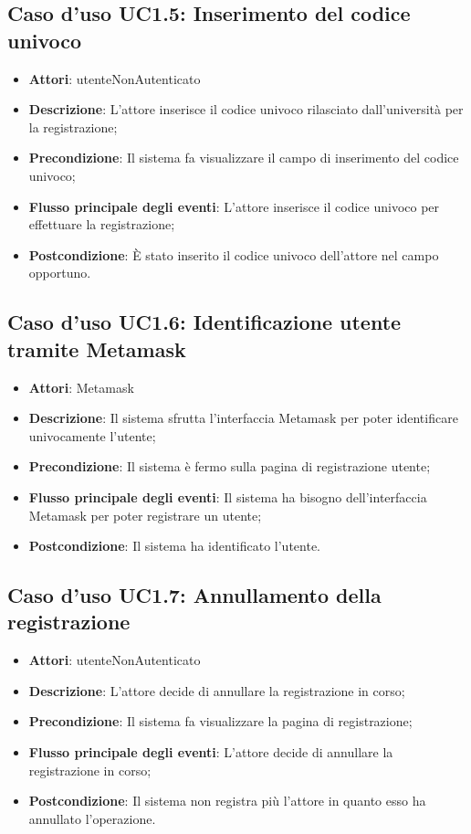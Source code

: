 \subsection{Caso d'uso \texorpdfstring{UC1.5}{UC1.5}: Inserimento del codice univoco}
\begin{itemize}
\item \textbf{Attori}: utenteNonAutenticato
\item \textbf{Descrizione}: L'attore inserisce il codice univoco rilasciato dall'università per la registrazione;
\item \textbf{Precondizione}: Il sistema fa visualizzare il campo di inserimento del codice univoco;
\item \textbf{Flusso principale degli eventi}: L'attore inserisce il codice univoco per effettuare la registrazione;
\item \textbf{Postcondizione}: È stato inserito il codice univoco dell'attore nel campo opportuno.
\end{itemize}
\subsection{Caso d'uso \texorpdfstring{UC1.6}{UC1.6}: Identificazione utente tramite Metamask}
\begin{itemize}
\item \textbf{Attori}: Metamask
\item \textbf{Descrizione}: Il sistema sfrutta l'interfaccia Metamask per poter identificare univocamente l'utente;
\item \textbf{Precondizione}: Il sistema è fermo sulla pagina di registrazione utente;
\item \textbf{Flusso principale degli eventi}: Il sistema ha bisogno dell'interfaccia Metamask per poter registrare un utente;
\item \textbf{Postcondizione}: Il sistema ha identificato l'utente.
\end{itemize}
\subsection{Caso d'uso \texorpdfstring{UC1.7}{UC1.7}: Annullamento della registrazione}
\begin{itemize}
\item \textbf{Attori}: utenteNonAutenticato
\item \textbf{Descrizione}: L'attore decide di annullare la registrazione in corso;
\item \textbf{Precondizione}: Il sistema fa visualizzare la pagina di registrazione;
\item \textbf{Flusso principale degli eventi}: L'attore decide di annullare la registrazione in corso;
\item \textbf{Postcondizione}: Il sistema non registra più l'attore in quanto esso ha annullato l'operazione.
\end{itemize}
